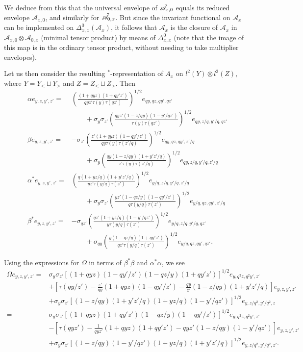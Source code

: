 We deduce from this that the universal envelope of $\tilde{\mathscr{A}}_{x,0}$ equals its reduced envelope $\mathcal{A}_{x,0}$, and similarly for $\tilde{\mathscr{A}}_{0,x}$. But since the invariant functional on $\mathscr{A}_x$ can be implemented on $\Delta_{x,x}^0(\mathscr{A}_x)$, it follows that $\mathcal{A}_x$ is the closure of $\mathscr{A}_x$ in $\mathcal{A}_{x,0}\otimes \mathcal{A}_{0,x}$ (minimal tensor product) by means of $\Delta_{x,x}^0$ (note that the image of this map is in the ordinary tensor product, without needing to take multiplier envelopes).

Let us then consider the resulting $^*$-representation of $A_{x}$ on $l^2(Y)\otimes l^2(Z)$, where $Y = Y_<\sqcup Y_>$ and $Z = Z_< \sqcup Z_>$. Then \begin{align*} \alpha e_{y,z,y',z'} = &\left(\frac{(1+qyz)(1+qy'z')}{qyz'\tau(y)\tau(qz')}\right)^{1/2} e_{qy,qz,qy',qz'} \\& \qquad + \sigma_y\sigma_{z'} \left(\frac{qyz'(1-z/qy)(1-y'/qz')}{\tau(y)\tau(qz')}\right)^{1/2}e_{qy,z/q,y'/q,qz'}\\
\beta e_{y,z,y',z'} =&  -\sigma_{z'} \left( \frac{z' (1+qyz)(1- qy'/z')}{qy\tau(y)\tau(z'/q)}\right)^{1/2}e_{qy,qz,qy',z'/q} \\ & \qquad +\sigma_y \left( \frac{qy(1-z/qy)(1+y'z'/q)}{z'\tau(y)\tau(z'/q)}\right)^{1/2} e_{qy,z/q,y'/q,z'/q}\\
\alpha^* e_{y,z,y',z'} = &\left(\frac{q(1+yz/q)(1+y'z'/q)}{yz'\tau(y/q)\tau(z')}\right)^{1/2} e_{y/q,z/q,y'/q,z'/q} \\& \qquad + \sigma_{y}\sigma_{z'} \left(\frac{yz'(1-qz/y)(1-qy'/z')}{q\tau(y/q)\tau(z')}\right)^{1/2}e_{y/q,qz,qy',z'/q}\\
\beta^* e_{y,z,y',z'} =&  -\sigma_{qz'} \left( \frac{qz' (1+yz/q)(1- y'/qz')}{y\tau(y/q)\tau(z')}\right)^{1/2}e_{y/q,z/q,y'/q,qz'} \\ & \qquad +\sigma_{qy} \left( \frac{y(1-qz/y)(1+qy'z')}{qz'\tau(y/q)\tau(z')}\right)^{1/2} e_{y/q,qz,qy',qz'}.
\end{align*}


Using the expressions for $\Omega$ in terms of $\beta^*\beta$ and $\alpha^*\alpha$, we see \begin{align*} \Omega e_{y,z,y',z'} =& \sigma_y\sigma_{z'} [(1+qyz)(1- qy'/z')(1-qz/y)(1+qy'z')]^{1/2} e_{y,q^2z,q^2y',z'} \\ & + \left[\tau(qy/z')-\frac{z'}{qy} (1+qyz)(1- qy'/z')-\frac{qy}{z'}(1-z/qy)(1+y'z'/q)\right] e_{y,z,y',z'}  
    \\ &  +\sigma_y\sigma_{z'}  [(1-z/qy)(1+y'z'/q)(1+yz/q)(1- y'/qz')]^{1/2} e_{y,z/q^2,y'/q^2,z} \\
    =& \sigma_y\sigma_{z'} [(1+qyz)(1+qy'z')(1-qz/y)(1-qy'/z')]^{1/2} e_{y,q^2z,q^2y',z'} \\ &-\left[\tau(qyz')- \frac{1}{qyz'}(1+qyz)(1+qy'z') -qyz' (1-z/qy)(1-y'/qz')\right]e_{y,z,y',z'}\\ &+ \sigma_y\sigma_{z'} [(1-z/qy)(1-y'/qz')(1+yz/q)(1+y'z'/q)]^{1/2}e_{y,z/q^2,y'/q^2,z'}. \end{align*}

